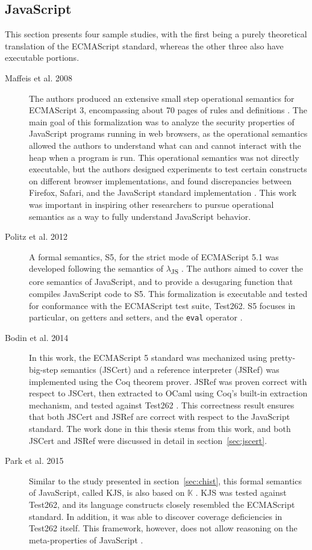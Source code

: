 \documentclass[a4paper,11pt,twoside]{report}
\begin{document}
\subsection{JavaScript}
This section presents four sample studies, with the first being a purely theoretical translation of the ECMAScript standard, whereas the other three also have executable portions.

\begin{description}
\item[Maffeis et al. 2008] The authors produced an extensive small step operational semantics for ECMAScript 3, encompassing about 70 pages of rules and definitions \cite{Maffeis:2008}. The main goal of this formalization was to analyze the security properties of JavaScript programs running in web browsers, as the operational semantics allowed the authors to understand what can and cannot interact with the heap when a program is run. This operational semantics was not directly executable, but the authors designed experiments to test certain constructs on different browser implementations, and found discrepancies between Firefox, Safari, and the JavaScript standard implementation \cite{Maffeis:2008}. This work was important in inspiring other researchers to pursue operational semantics as a way to fully understand JavaScript behavior.

\item[Politz et al. 2012] A formal semantics, S5, for the strict mode of ECMAScript 5.1 was developed following the semantics of $\lambda$\textsubscript{JS} \cite{Guha:2010}. The authors aimed to cover the core semantics of JavaScript, and to provide a desugaring function that compiles JavaScript code to S5. This formalization is executable and tested for conformance with the ECMAScript test suite, Test262. S5 focuses in particular, on getters and setters, and the \texttt{eval} operator \cite{Politz:2012}.

\item[Bodin et al. 2014] In this work, the ECMAScript 5 standard was mechanized using pretty-big-step semantics (JSCert) and a reference interpreter (JSRef) was implemented using the Coq theorem prover. JSRef was proven correct with respect to JSCert, then extracted to OCaml using Coq's built-in extraction mechanism, and tested against Test262 \cite{Bodin:2014}. This correctness result ensures that both JSCert and JSRef are correct with respect to the JavaScript standard. The work done in this thesis stems from this work, and both JSCert and JSRef were discussed in detail in section~\ref{sec:jscert}.

\item[Park et al. 2015] Similar to the study presented in section~\ref{sec:chist}, this formal semantics of JavaScript, called KJS, is also based on $\mathbb{K}$ \cite{k-primer-2013-v32}. KJS was tested against Test262, and its language constructs closely resembled the ECMAScript standard. In addition, it was able to discover coverage deficiencies in Test262 itself. This framework, however, does not allow reasoning on the meta-properties of JavaScript \cite{Park:2015}.
\end{description}
\end{document}
